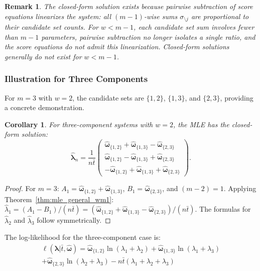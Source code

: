 \documentclass[pdflatex,sn-mathphys-num,Numbered]{sn-jnl}
\newcommand{\estimator}[1]{\hat{#1}}   %
\newcommand{\expomle}{\boldsymbol{\hat{\lambda}}_n}
\newcommand{\cntsymb}{\boldsymbol{\hat\omega}}
\newcommand{\cnt}[1]{\cntsymb_{\{#1\}}}
\renewcommand{\vec}[1]{\boldsymbol{#1}}
\theoremstyle{thmstyleone}
\newtheorem{corollary}[theorem]{Corollary}
\theoremstyle{thmstylethree}
\theoremstyle{thmstyletwo}
\newtheorem{remark}[theorem]{Remark}
\begin{document}
\begin{remark}
The closed-form solution exists because pairwise subtraction of score equations linearizes the system: all $(m-1)$-wise sums $\sigma_{\setminus j}$ are proportional to their candidate set counts. For $w < m-1$, each candidate set sum involves fewer than $m-1$ parameters, pairwise subtraction no longer isolates a single ratio, and the score equations do not admit this linearization. Closed-form solutions generally do not exist for $w < m-1$.
\end{remark}

\subsubsection{Illustration for Three Components}

For $m=3$ with $w=2$, the candidate sets are $\{1,2\}$, $\{1,3\}$, and $\{2,3\}$, providing a concrete demonstration.

\begin{corollary}
\label{cor:mle_3comp_w2}
For three-component systems with $w=2$, the MLE has the closed-form solution:
\begin{equation}
\label{eq:expo_mle_3comp_w2}
\expomle = \frac{1}{n\bar{t}} \begin{pmatrix}
\cnt{1,2} + \cnt{1,3} - \cnt{2,3}\\
\cnt{1,2} - \cnt{1,3} + \cnt{2,3}\\
-\cnt{1,2} + \cnt{1,3} + \cnt{2,3}
\end{pmatrix}.
\end{equation}
\end{corollary}

\begin{proof}
For $m=3$: $A_1 = \cnt{1,2} + \cnt{1,3}$, $B_1 = \cnt{2,3}$, and $(m-2) = 1$. Applying Theorem~\ref{thm:mle_general_wm1}: $\estimator{\lambda}_1 = (A_1 - B_1)/(n\bar{t}) = (\cnt{1,2} + \cnt{1,3} - \cnt{2,3})/(n\bar{t})$. The formulas for $\estimator{\lambda}_2$ and $\estimator{\lambda}_3$ follow symmetrically.
\end{proof}

The log-likelihood for the three-component case is:
\begin{multline}
\ell(\vec{\lambda} | \bar{t}, \cntsymb) = \cnt{1,2} \ln(\lambda_1 + \lambda_2) + \cnt{1,3} \ln(\lambda_1 + \lambda_3) \\
 + \cnt{2,3} \ln(\lambda_2 + \lambda_3) - n\bar{t}(\lambda_1 + \lambda_2 + \lambda_3)
\end{multline}
\end{document}

